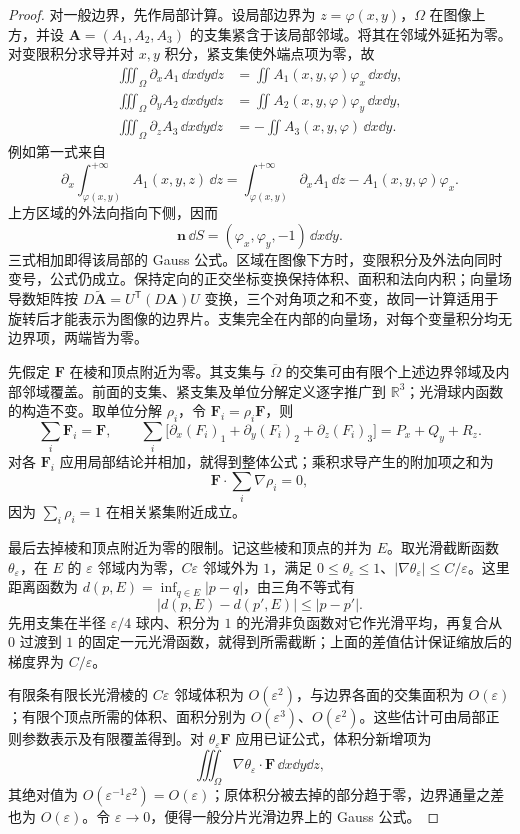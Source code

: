 \begin{remark}[闭曲线与封闭曲面对应的两种条件]
\begin{proof}
对一般边界，先作局部计算。设局部边界为 $z=\varphi(x,y)$，$\Omega$ 在图像上方，并设 $\boldsymbol A=(A_1,A_2,A_3)$ 的支集紧含于该局部邻域。将其在邻域外延拓为零。对变限积分求导并对 $x,y$ 积分，紧支集使外端点项为零，故
\begin{align*}
\iiint_\Omega\partial_x A_1\,\dd x\dd y\dd z
&=\displaystyle\iint A_1(x,y,\varphi)\varphi_x\,\dd x\dd y,\\
\iiint_\Omega\partial_y A_2\,\dd x\dd y\dd z
&=\displaystyle\iint A_2(x,y,\varphi)\varphi_y\,\dd x\dd y,\\
\iiint_\Omega\partial_z A_3\,\dd x\dd y\dd z
&=-\displaystyle\iint A_3(x,y,\varphi)\,\dd x\dd y.
\end{align*}
例如第一式来自
\[
\partial_x\int_{\varphi(x,y)}^{+\infty}A_1(x,y,z)\,\dd z
=\int_{\varphi(x,y)}^{+\infty}\partial_xA_1\,\dd z-A_1(x,y,\varphi)\varphi_x.
\]
上方区域的外法向指向下侧，因而
\[
\boldsymbol n\,\dd S=(\varphi_x,\varphi_y,-1)\,\dd x\dd y.
\]
三式相加即得该局部的 Gauss 公式。区域在图像下方时，变限积分及外法向同时变号，公式仍成立。保持定向的正交坐标变换保持体积、面积和法向内积；向量场导数矩阵按 $D\widetilde{\boldsymbol A}=U^{\mathsf T}(D\boldsymbol A)U$ 变换，三个对角项之和不变，故同一计算适用于旋转后才能表示为图像的边界片。支集完全在内部的向量场，对每个变量积分均无边界项，两端皆为零。

先假定 $\boldsymbol F$ 在棱和顶点附近为零。其支集与 $\overline\Omega$ 的交集可由有限个上述边界邻域及内部邻域覆盖。前面的支集、紧支集及单位分解定义逐字推广到 $\mathbb R^3$；光滑球内函数的构造不变。取单位分解 $\rho_i$，令 $\boldsymbol F_i=\rho_i\boldsymbol F$，则
\[
\sum_i\boldsymbol F_i=\boldsymbol F,\qquad
\sum_i\bigl[\partial_x(F_i)_1+\partial_y(F_i)_2+\partial_z(F_i)_3\bigr]=P_x+Q_y+R_z.
\]
对各 $\boldsymbol F_i$ 应用局部结论并相加，就得到整体公式；乘积求导产生的附加项之和为
\[
\boldsymbol F\cdot\sum_i\nabla\rho_i=0,
\]
因为 $\sum_i\rho_i=1$ 在相关紧集附近成立。

最后去掉棱和顶点附近为零的限制。记这些棱和顶点的并为 $E$。取光滑截断函数 $\theta_\varepsilon$，在 $E$ 的 $\varepsilon$ 邻域内为零，$C\varepsilon$ 邻域外为 $1$，满足 $0\le\theta_\varepsilon\le1$、$|\nabla\theta_\varepsilon|\le C/\varepsilon$。这里距离函数为 $d(p,E)=\inf_{q\in E}|p-q|$，由三角不等式有
\[
|d(p,E)-d(p',E)|\le |p-p'|.
\]
先用支集在半径 $\varepsilon/4$ 球内、积分为 $1$ 的光滑非负函数对它作光滑平均，再复合从 $0$ 过渡到 $1$ 的固定一元光滑函数，就得到所需截断；上面的差值估计保证缩放后的梯度界为 $C/\varepsilon$。

有限条有限长光滑棱的 $C\varepsilon$ 邻域体积为 $O(\varepsilon^2)$，与边界各面的交集面积为 $O(\varepsilon)$；有限个顶点所需的体积、面积分别为 $O(\varepsilon^3)$、$O(\varepsilon^2)$。这些估计可由局部正则参数表示及有限覆盖得到。对 $\theta_\varepsilon\boldsymbol F$ 应用已证公式，体积分新增项为
\[
\iiint_\Omega\nabla\theta_\varepsilon\cdot\boldsymbol F\,\dd x\dd y\dd z,
\]
其绝对值为 $O(\varepsilon^{-1}\varepsilon^2)=O(\varepsilon)$；原体积分被去掉的部分趋于零，边界通量之差也为 $O(\varepsilon)$。令 $\varepsilon\to0$，便得一般分片光滑边界上的 Gauss 公式。
\end{proof}


\end{remark}
